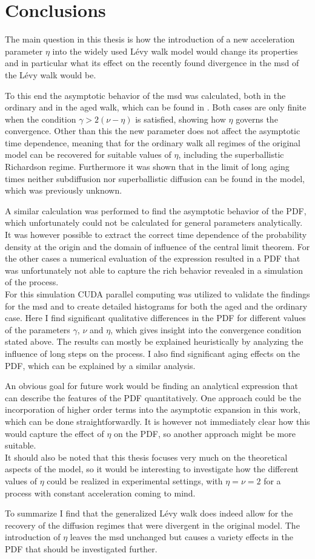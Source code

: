 \chapter{Conclusions}

The main question in this thesis is how the introduction of a new acceleration parameter $\eta$ into the widely used L\'evy walk model would change its properties and in particular what its effect on the recently found divergence in the \gls{msd} of the L\'evy walk would be. 

To this end the asymptotic behavior of the \gls{msd} was calculated, both in the ordinary and in the aged walk, which can be found in 
\cite{bothe}. 
Both cases are only finite when the condition $\gamma > 2(\nu-\eta)$ is satisfied, showing how $\eta$ governs the convergence. Other than this the new parameter does not affect the asymptotic time dependence, meaning that for the ordinary walk all regimes of the original model can be recovered for suitable values of $\eta$, including the superballistic Richardson regime. 
{\color{blue}
Furthermore it was shown that in the limit of long aging times neither subdiffusion nor superballistic diffusion can be found in the model, which was previously unknown.
}

A similar calculation was performed to find the asymptotic behavior of the \gls{PDF}, which unfortunately could not be calculated for general parameters analytically. It was however possible to extract the correct time dependence of the probability density at the origin and the domain of influence of the central limit theorem. For the other cases a numerical evaluation of the expression resulted in a \gls{PDF} that was unfortunately not able to capture the rich behavior revealed in a simulation of the process. \\
For this simulation CUDA parallel computing was utilized to validate the findings for the \gls{msd} and to create detailed histograms for both the aged and the ordinary case. Here I find significant qualitative differences in the \gls{PDF} for different values of the parameters $\gamma$, $\nu$ and $\eta$, which gives insight into the convergence condition stated above. The results can mostly be explained heuristically by analyzing the influence of long steps on the process. I also find significant aging effects on the \gls{PDF}, which can be explained by a similar analysis.

An obvious goal for future work would be finding an analytical expression that can describe the features of the PDF quantitatively. One approach could be the incorporation of higher order terms into the asymptotic expansion in this work, which can be done straightforwardly. It is however not immediately clear how this would capture the effect of $\eta$ on the \gls{PDF}, so another approach might be more suitable.\\
It should also be noted that this thesis focuses very much on the theoretical aspects of the model, so it would be interesting to investigate how the different values of $\eta$ could be realized in experimental settings, with $\eta=\nu=2$ for a process with constant acceleration coming to mind.

To summarize I find that the generalized L\'evy walk  does indeed allow for the recovery of the diffusion regimes that were divergent in the original model. The introduction of $\eta$ leaves the \gls{msd} unchanged but causes a variety effects in the \gls{PDF} that should be investigated further.


